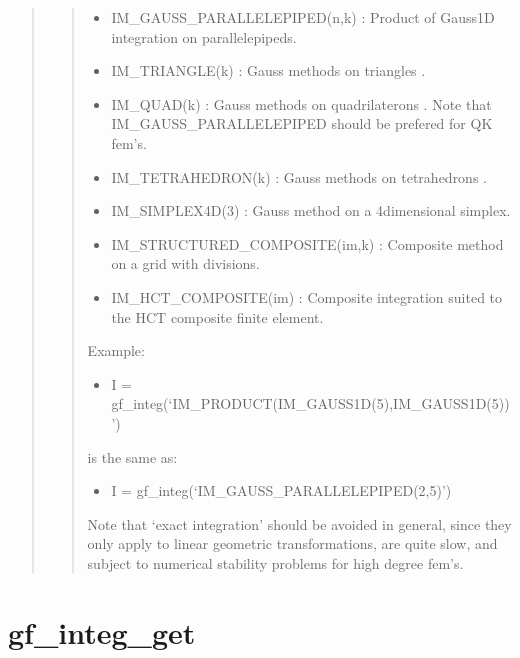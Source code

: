 \documentclass[a4paper,11pt,english]{sphinxmanual}
\begin{document}
\begin{quote}
\begin{quote}
\begin{itemize}
\item {} 
IM\_GAUSS\_PARALLELEPIPED(n,k) :
Product of Gauss1D integration on parallelepipeds.

\item {} 
IM\_TRIANGLE(k) :
Gauss methods on triangles .

\item {} 
IM\_QUAD(k) :
Gauss methods on quadrilaterons . Note that
IM\_GAUSS\_PARALLELEPIPED should be prefered for QK fem’s.

\item {} 
IM\_TETRAHEDRON(k) :
Gauss methods on tetrahedrons .

\item {} 
IM\_SIMPLEX4D(3) :
Gauss method on a 4\sphinxhyphen{}dimensional simplex.

\item {} 
IM\_STRUCTURED\_COMPOSITE(im,k) :
Composite method on a grid with  divisions.

\item {} 
IM\_HCT\_COMPOSITE(im) :
Composite integration suited to the HCT composite finite element.

\end{itemize}

Example:
\begin{itemize}
\item {} 
I = gf\_integ(‘IM\_PRODUCT(IM\_GAUSS1D(5),IM\_GAUSS1D(5))’)

\end{itemize}

is the same as:
\begin{itemize}
\item {} 
I = gf\_integ(‘IM\_GAUSS\_PARALLELEPIPED(2,5)’)

\end{itemize}

Note that ‘exact integration’ should be avoided in general, since they
only apply to linear geometric transformations, are quite slow, and
subject to numerical stability problems for high degree fem’s.
\end{quote}
\end{quote}


\section{gf\_integ\_get}
\label{\detokenize{matlab_octave/cmdref_gf_integ_get:gf-integ-get}}\label{\detokenize{matlab_octave/cmdref_gf_integ_get::doc}}
\end{document}
